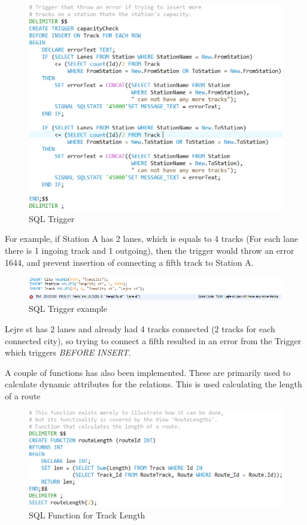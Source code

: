\begin{figure}[ht!]
    \centering
    \includegraphics[width=1\textwidth]{img/SQL_TRIGGER}
    \caption{SQL Trigger}
\end{figure}

For example, if Station A has 2 lanes, which is equals to 4 tracks (For each 
lane there is 1 ingoing track and 1 outgoing), then the trigger would throw an 
error 1644, and prevent insertion of connecting a fifth track to Station A.

\begin{figure}[ht!]
    \centering
    \includegraphics[width=1\textwidth]{img/SQL_TRIGGER_example}
    \caption{SQL Trigger example}
\end{figure}

Lejre st has 2 lanes and already had 4 tracks connected (2 tracks for each 
connected city), so trying to connect a fifth resulted in an error from the 
Trigger which triggers \emph{BEFORE INSERT}.

A couple of functions has also been implemented. These are primarily used to 
calculate dynamic attributes for the relations.
This is used calculating the length of a route

\begin{figure}[ht!]
    \centering
    \includegraphics[width=1\textwidth]{img/SQL_FUNCTION_Length}
    \caption{SQL Function for Track Length}
\end{figure}

